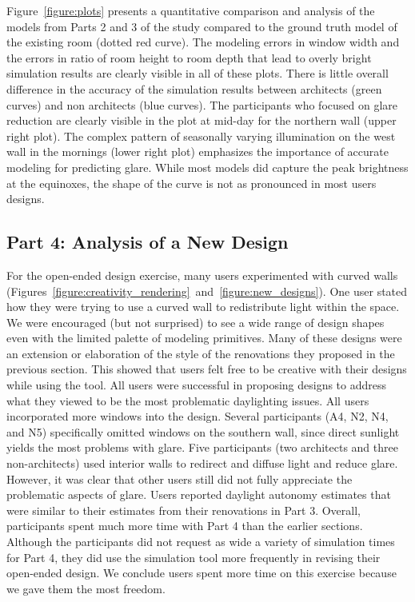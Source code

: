 \documentclass[preprint]{elsarticle}
\begin{document}
Figure~\ref{figure:plots} presents a quantitative comparison and
analysis of the models from Parts 2 and 3 of the study compared to the
ground truth model of the existing room (dotted red curve).  The
modeling errors in window width and the errors in ratio of room height
to room depth
that lead to overly bright simulation results are clearly visible in
all of these plots.  There is little overall difference in the
accuracy of the simulation results between architects (green curves)
and non architects (blue curves).  The participants who focused on
glare reduction are clearly visible in the plot at mid-day for the
northern wall (upper right plot).  The complex pattern of seasonally
varying illumination on the west wall in the mornings (lower right plot)
emphasizes the importance of accurate modeling for predicting glare.
While most models did capture the peak brightness at the equinoxes,
the shape of the curve is not as pronounced in most users designs.

\subsection{Part 4: Analysis of a New Design} 

For the open-ended design exercise, many users experimented with
curved walls
(Figures~\ref{figure:creativity_rendering}~and~\ref{figure:new_designs}).
One user stated how they were trying to use a curved wall to
redistribute light within the space.  We were encouraged (but not
surprised) to see a wide range of design shapes even with the limited
palette of modeling primitives.  Many of these designs were an
extension or elaboration of the style of the renovations they proposed
in the previous section.  This showed that users felt free to be creative
with their designs while using the tool.
%
All users were successful in proposing designs to address what they
viewed to be the most problematic daylighting issues. All users
incorporated more windows into the design.  Several participants (A4,
N2, N4, and N5) specifically omitted windows on the southern wall,
since direct sunlight yields the most problems with glare.  Five
participants (two architects and three non-architects) used interior
walls to redirect and diffuse light and reduce glare.  However, it was
clear that other users still did not fully appreciate the problematic
aspects of glare.  Users reported daylight autonomy estimates that
were similar to their estimates from their renovations in Part 3.
%
Overall, participants spent much more time with Part 4 than the
earlier sections.  Although the participants did not request as wide a
variety of simulation times for Part 4, they did use the simulation
tool more frequently in revising their open-ended design.  We conclude
users spent more time on this exercise because we gave them the most
freedom.
\end{document}
